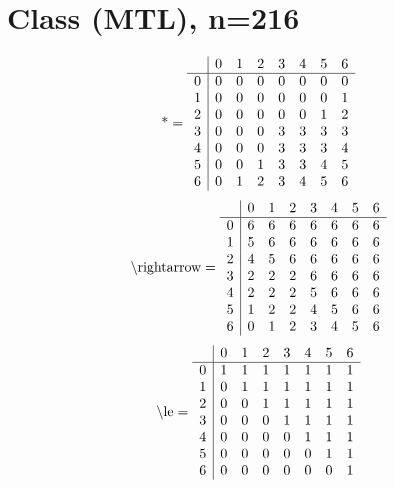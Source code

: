 \documentclass[11pt]{article}
\begin{document}
\section{Class (MTL), n=216}
\[\text{*} = 
\begin{array}{r | r r r r r r r}
 & 0 & 1 & 2 & 3 & 4 & 5 & 6 \\ \hline
0 & 0 & 0 & 0 & 0 & 0 & 0 & 0 \\
1 & 0 & 0 & 0 & 0 & 0 & 0 & 1 \\
2 & 0 & 0 & 0 & 0 & 0 & 1 & 2 \\
3 & 0 & 0 & 0 & 3 & 3 & 3 & 3 \\
4 & 0 & 0 & 0 & 3 & 3 & 3 & 4 \\
5 & 0 & 0 & 1 & 3 & 3 & 4 & 5 \\
6 & 0 & 1 & 2 & 3 & 4 & 5 & 6 \\
\end{array}
\]
\[\text{\textbackslash rightarrow} = 
\begin{array}{r | r r r r r r r}
 & 0 & 1 & 2 & 3 & 4 & 5 & 6 \\ \hline
0 & 6 & 6 & 6 & 6 & 6 & 6 & 6 \\
1 & 5 & 6 & 6 & 6 & 6 & 6 & 6 \\
2 & 4 & 5 & 6 & 6 & 6 & 6 & 6 \\
3 & 2 & 2 & 2 & 6 & 6 & 6 & 6 \\
4 & 2 & 2 & 2 & 5 & 6 & 6 & 6 \\
5 & 1 & 2 & 2 & 4 & 5 & 6 & 6 \\
6 & 0 & 1 & 2 & 3 & 4 & 5 & 6 \\
\end{array}
\]
\[\text{\textbackslash le} = 
\begin{array}{r | r r r r r r r}
 & 0 & 1 & 2 & 3 & 4 & 5 & 6 \\ \hline
0 & 1 & 1 & 1 & 1 & 1 & 1 & 1 \\
1 & 0 & 1 & 1 & 1 & 1 & 1 & 1 \\
2 & 0 & 0 & 1 & 1 & 1 & 1 & 1 \\
3 & 0 & 0 & 0 & 1 & 1 & 1 & 1 \\
4 & 0 & 0 & 0 & 0 & 1 & 1 & 1 \\
5 & 0 & 0 & 0 & 0 & 0 & 1 & 1 \\
6 & 0 & 0 & 0 & 0 & 0 & 0 & 1 \\
\end{array}
\]
\end{document}
